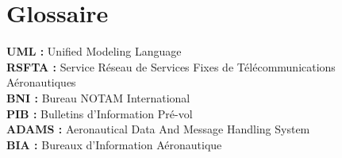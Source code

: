 \chapter*{Glossaire}


\textbf{UML : } Unified Modeling Language \\

\textbf{RSFTA : } Service Réseau de Services Fixes de Télécommunications Aéronautiques \\

\textbf{BNI : } Bureau NOTAM International\\

\textbf{PIB : } Bulletins d’Information Pré-vol\\

\textbf{ADAMS : } Aeronautical Data And Message Handling System\\

\textbf{BIA : } Bureaux d’Information Aéronautique \\
